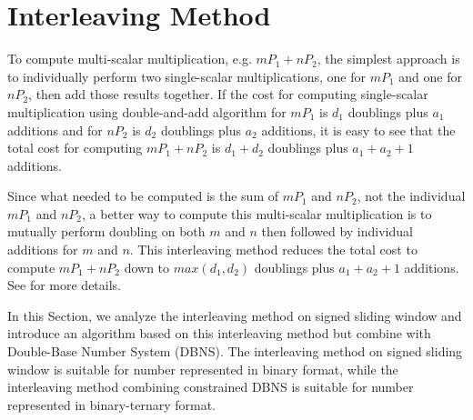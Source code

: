 \section{Interleaving Method}
\label{sec:interleaving}
To compute multi-scalar multiplication, e.g. $mP_1 + nP_2$,
the simplest approach is to individually perform two single-scalar multiplications,
one for $mP_1$ and one for $nP_2$, then add those results together.
If the cost for computing single-scalar multiplication using double-and-add algorithm
for $mP_1$ is $d_1$ doublings plus $a_1$ additions and for $nP_2$ is $d_2$ doublings plus $a_2$ additions,
it is easy to see that the total cost for computing $mP_1 + nP_2$ is $d_1 + d_2$ doublings plus $a_1 + a_2 + 1$ additions.

Since what needed to be computed is the sum of $mP_1$ and $nP_2$, not the individual $mP_1$ and $nP_2$,
a better way to compute this multi-scalar multiplication is to mutually perform doubling on both $m$ and $n$
then followed by individual additions for $m$ and $n$.
This interleaving method reduces the total cost to compute $mP_1 + nP_2$ down to
$max(d_1,d_2)$ doublings plus $a_1 + a_2 + 1$ additions.
See \cite{DI08} for more details.


In this Section, we analyze the interleaving method on signed sliding window \cite{interleaving}
and introduce an algorithm based on this interleaving method but combine with Double-Base Number System (DBNS).
The interleaving method on signed sliding window is suitable for number represented in binary format,
while the interleaving method combining constrained DBNS is suitable for number represented in binary-ternary format.



